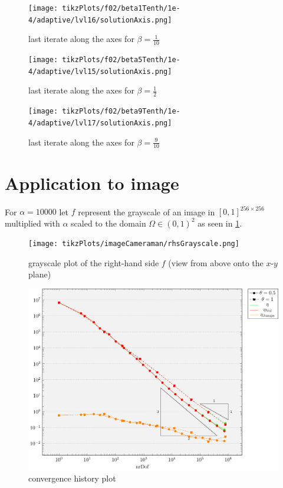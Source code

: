 \documentclass[draft=false,twoside,12pt]{scrreprt}
\begin{document}
\vspace{-\parskip}
\begin{minipage}[t]{0.3\textwidth}
  \begin{figure}[H]
	  \centering
		\texttt{[image: tikzPlots/f02/beta1Tenth/1e-4/adaptive/lvl16/solutionAxis.png]} 
      \caption{last iterate along the axes for $\beta=\frac{1}{10}$}
  \end{figure}
\end{minipage}
\hfill
\vline
\hfill
\begin{minipage}[t]{0.3\textwidth}
  \begin{figure}[H]
	  \centering
		\texttt{[image: tikzPlots/f02/beta5Tenth/1e-4/adaptive/lvl15/solutionAxis.png]} 
      \caption{last iterate along the axes for $\beta=\frac{1}{2}$}
  \end{figure}
\end{minipage}
\hfill
\vline
\hfill
\begin{minipage}[t]{0.3\textwidth}
  \begin{figure}[H]
	  \centering
		\texttt{[image: tikzPlots/f02/beta9Tenth/1e-4/adaptive/lvl17/solutionAxis.png]} 
      \caption{last iterate along the axes for $\beta=\frac{9}{10}$}
  \end{figure}
\end{minipage}

\section{Application to image}
For $\alpha = 10000$ let $f$ represent the grayscale of an image in
$[0,1]^{256\times 256}$ multiplied with $\alpha$ scaled to the domain
$\Omega\in(0,1)^2$ as seen in \cref{fig:rhsCameraman}.

\begin{figure}[H]
	\centering
	\texttt{[image: tikzPlots/imageCameraman/rhsGrayscale.png]}
  \caption{grayscale plot of the right-hand side $f$ (view from above onto the
  $x$-$y$ plane)}
  \label{fig:rhsCameraman}
\end{figure}

\begin{figure}[H]
	\centering
	\includegraphics[width=16cm]
  {tikzPlots/imageCameraman/convergence.pdf}
  \caption{convergence history plot}
\end{figure}
\end{document}

